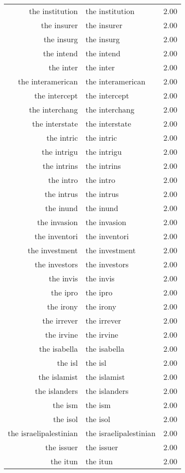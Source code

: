 \begin{table}[ht]
\begin{tabular}{rlr}
  the institution & the institution & 2.00 \\ 
  the insurer & the insurer & 2.00 \\ 
  the insurg & the insurg & 2.00 \\ 
  the intend & the intend & 2.00 \\ 
  the inter & the inter & 2.00 \\ 
  the interamerican & the interamerican & 2.00 \\ 
  the intercept & the intercept & 2.00 \\ 
  the interchang & the interchang & 2.00 \\ 
  the interstate & the interstate & 2.00 \\ 
  the intric & the intric & 2.00 \\ 
  the intrigu & the intrigu & 2.00 \\ 
  the intrins & the intrins & 2.00 \\ 
  the intro & the intro & 2.00 \\ 
  the intrus & the intrus & 2.00 \\ 
  the inund & the inund & 2.00 \\ 
  the invasion & the invasion & 2.00 \\ 
  the inventori & the inventori & 2.00 \\ 
  the investment & the investment & 2.00 \\ 
  the investors & the investors & 2.00 \\ 
  the invis & the invis & 2.00 \\ 
  the ipro & the ipro & 2.00 \\ 
  the irony & the irony & 2.00 \\ 
  the irrever & the irrever & 2.00 \\ 
  the irvine & the irvine & 2.00 \\ 
  the isabella & the isabella & 2.00 \\ 
  the isl & the isl & 2.00 \\ 
  the islamist & the islamist & 2.00 \\ 
  the islanders & the islanders & 2.00 \\ 
  the ism & the ism & 2.00 \\ 
  the isol & the isol & 2.00 \\ 
  the israelipalestinian & the israelipalestinian & 2.00 \\ 
  the issuer & the issuer & 2.00 \\ 
  the itun & the itun & 2.00 \\ 

\end{tabular}
\end{table}
